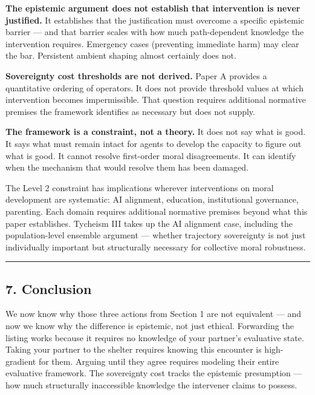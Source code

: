 \documentclass[
]{article}
\begin{document}
\textbf{The epistemic argument does not establish that intervention is
never justified.} It establishes that the justification must overcome a
specific epistemic barrier --- and that barrier scales with how much
path-dependent knowledge the intervention requires. Emergency cases
(preventing immediate harm) may clear the bar. Persistent ambient
shaping almost certainly does not.

\textbf{Sovereignty cost thresholds are not derived.} Paper A provides a
quantitative ordering of operators. It does not provide threshold values
at which intervention becomes impermissible. That question requires
additional normative premises the framework identifies as necessary but
does not supply.

\textbf{The framework is a constraint, not a theory.} It does not say
what is good. It says what must remain intact for agents to develop the
capacity to figure out what is good. It cannot resolve first-order moral
disagreements. It can identify when the mechanism that would resolve
them has been damaged.

The Level 2 constraint has implications wherever interventions on moral
development are systematic: AI alignment, education, institutional
governance, parenting. Each domain requires additional normative
premises beyond what this paper establishes. Tycheism III takes up the
AI alignment case, including the population-level ensemble argument ---
whether trajectory sovereignty is not just individually important but
structurally necessary for collective moral robustness.

\begin{center}\rule{0.5\linewidth}{0.5pt}\end{center}

\subsection{7. Conclusion}\label{conclusion}

We now know why those three actions from Section 1 are not equivalent
--- and now we know why the difference is epistemic, not just ethical.
Forwarding the listing works because it requires no knowledge of your
partner's evaluative state. Taking your partner to the shelter requires
knowing this encounter is high-gradient for them. Arguing until they
agree requires modeling their entire evaluative framework. The
sovereignty cost tracks the epistemic presumption --- how much
structurally inaccessible knowledge the intervener claims to possess.
\end{document}
